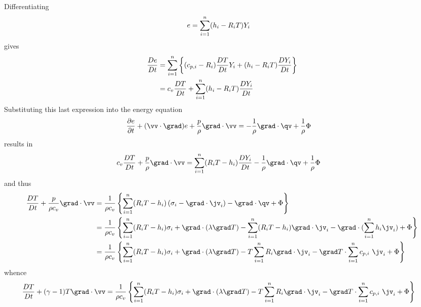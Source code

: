 \documentclass{article}
\begin{document}
Differentiating
\begin{align*}
  e &= \sum_{i=1}^n( h_i - R_i T)Y_i 
\end{align*}
gives
\begin{align*}
  {D e\over Dt} &= \sum_{i=1}^n\left\{ (c_{p,i}-R_i){D T\over Dt} Y_i + (h_i-R_i T){D Y_i\over Dt} \right\} \\
                &= c_v {D T\over Dt} + \sum_{i=1}^n  (h_i-R_i T){D Y_i\over Dt}  
\end{align*}
Substituting this last expression into the energy equation
\begin{align*}
   {\partial e  \over \partial t}  + (\vv\cdot\grad)e + {p\over\rho}\grad\cdot\vv
           &= -{1\over\rho} \grad\cdot\qv  + {1\over\rho}\Phi 
\end{align*}
results in
\begin{align*}
  c_v {D T\over Dt} + {p\over\rho}\grad\cdot\vv & = \sumi  (R_i T-h_i){D Y_i\over Dt}
                 -{1\over\rho} \grad\cdot\qv  + {1\over\rho}\Phi \label{eq:Ta}
\end{align*}
and thus
\begin{align*}
  {D T\over Dt} + {p\over\rho c_v}\grad\cdot\vv & = 
       {1\over \rho c_v}  \left\{ \sumi  (R_i T-h_i)\left( \sigma_i -\grad\cdot \jv_i \right) 
           - \grad\cdot\qv  + \Phi \right\} \\
   & = {1\over \rho c_v}  \left\{ \sumi  (R_i T-h_i) \sigma_i + \grad\cdot(\lambda\grad T)
      -\sumi  (R_i T-h_i) \grad\cdot\jv_i - \grad\cdot( \sumi h_i \jv_i)
              + \Phi \right\} \\
   & = {1\over \rho c_v}  \left\{ \sumi  (R_i T-h_i) \sigma_i + \grad\cdot(\lambda\grad T)
      - T \sumi  R_i \grad\cdot\jv_i - \grad T \cdot\sumi c_{p,i} ~\jv_i
              + \Phi \right\} 
\end{align*}
whence
\begin{align*}
  {D T\over Dt} + (\gamma-1) T \grad\cdot\vv & = 
       {1\over \rho c_v}  \left\{ \sumi  (R_i T-h_i) \sigma_i + \grad\cdot(\lambda\grad T)
      - T \sumi  R_i \grad\cdot\jv_i - \grad T \cdot\sumi c_{p,i} ~ \jv_i
              + \Phi \right\} 
\end{align*}
\end{document}
